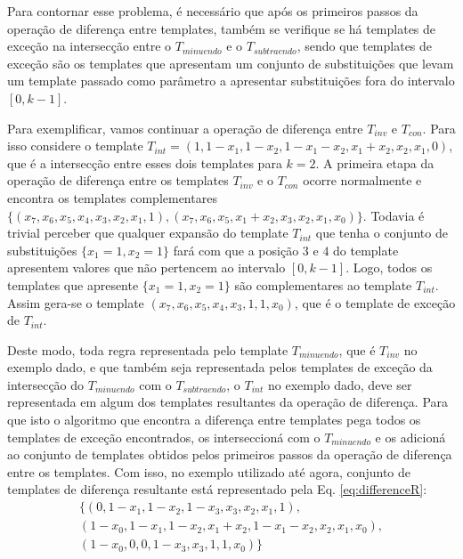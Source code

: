 \documentclass[12pt, a4paper]{article}
\begin{document}
Para contornar esse problema, é necessário que após os primeiros passos da operação de diferença entre templates, também se verifique se há templates de exceção na intersecção entre o $T_{minuendo}$ e o $T_{subtraendo}$, sendo que templates de exceção são os templates que apresentam um conjunto de substituições que levam um template passado como parâmetro a apresentar substituições fora do intervalo $[0,k-1]$.

Para exemplificar, vamos continuar a operação de diferença entre $T_{inv}$ e $T_{con}$. Para isso considere o template $T_{int} = (1, 1 - x_1, 1 - x_2, 1 - x_1 - x_2, x_1 + x_2, x_2, x_1, 0)$, que é a intersecção entre esses dois templates para $k=2$.
A primeira etapa da operação de diferença entre os templates $T_{inv}$ e o $T_{con}$ ocorre normalmente e encontra os templates complementares $\{(x_7, x_6, x_5, x_4, x_3, x_2, x_1, 1),(x_7, x_6, x_5, x_1 + x_2, x_3, x_2, x_1, x_0)\}$.
Todavia é trivial perceber que qualquer expansão do template $T_{int}$ que tenha o conjunto de substituições $\{x_1 = 1, x_2 = 1\}$ fará com que a posição $3$ e $4$ do template apresentem valores que não pertencem ao intervalo $[0,k-1]$.
Logo, todos os templates que apresente $\{x_1 = 1, x_2 = 1\}$ são complementares ao template $T_{int}$. Assim gera-se o template $(x_7, x_6, x_5, x_4, x_3, 1, 1, x_0)$, que é o template de exceção de $T_{int}$.

Deste modo, toda regra representada pelo template $T_{minuendo}$, que é $T_{inv}$ no exemplo dado, e que também seja representada pelos templates de exceção da intersecção do $T_{minuendo}$ com o $T_{subtraendo}$, o $T_{int}$ no exemplo dado, deve ser representada em algum dos templates resultantes da operação de diferença. Para que isto o algoritmo que encontra a diferença entre templates pega todos os templates de exceção encontrados, os interseccioná com o $T_{minuendo}$ e os adicioná ao conjunto de templates obtidos pelos primeiros passos da operação de diferença entre os templates. Com isso, no exemplo utilizado até agora, conjunto de templates de diferença resultante está representado pela Eq. \ref{eq:differenceR}:
\begin{equation}
\begin{split}
\{(0, 1 - x_1, 1 - x_2, 1 - x_3, x_3, x_2, x_1, 1), \\
(1 - x_0, 1 - x_1, 1 - x_2, x_1 + x_2, 1 - x_1 - x_2, x_2, x_1, x_0), \\
(1 - x_0, 0, 0, 1 - x_3, x_3, 1, 1, x_0)\}
\label{eq:differenceR}
\end{split}
\end{equation}
\end{document}
